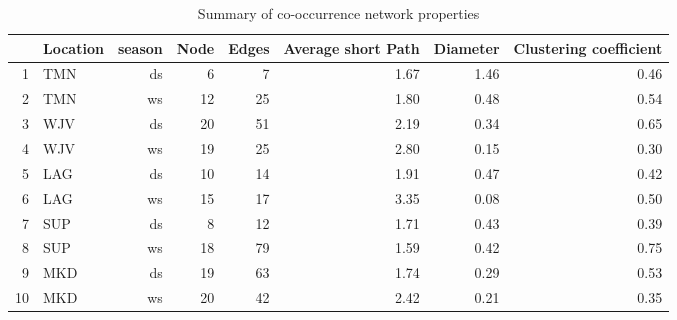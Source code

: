 
\begin{table}[ht]
\centering
\begin{tabular}{rlrrrrrr}
  \hline
 & Location & season & Node & Edges & Average short Path & Diameter & Clustering coefficient \\ 
  \hline
  1 & TMN & ds &   6 & 7 & 1.67 & 1.46 &  0.46 \\ 
  2 & TMN & ws &  12 & 25 & 1.80 & 0.48 & 0.54 \\ 
  3 & WJV & ds &  20 & 51 & 2.19 & 0.34 & 0.65 \\ 
  4 & WJV & ws &  19 & 25 & 2.80 & 0.15 & 0.30 \\ 
  5 & LAG & ds &  10 & 14 & 1.91 & 0.47 & 0.42 \\ 
  6 & LAG & ws &  15 & 17 & 3.35 & 0.08 & 0.50 \\ 
  7 & SUP & ds &   8 & 12 & 1.71 & 0.43 & 0.39 \\ 
  8 & SUP & ws &  18 & 79 & 1.59 & 0.42 & 0.75 \\ 
  9 & MKD & ds &  19 & 63 & 1.74 & 0.29 & 0.53 \\ 
  10 & MKD &ws &  20 & 42 & 2.42 & 0.21 & 0.35 \\ 
   \hline
\end{tabular}
\caption{Summary of co-occurrence network properties}
\label{table:Network_stat}
\end{table}

